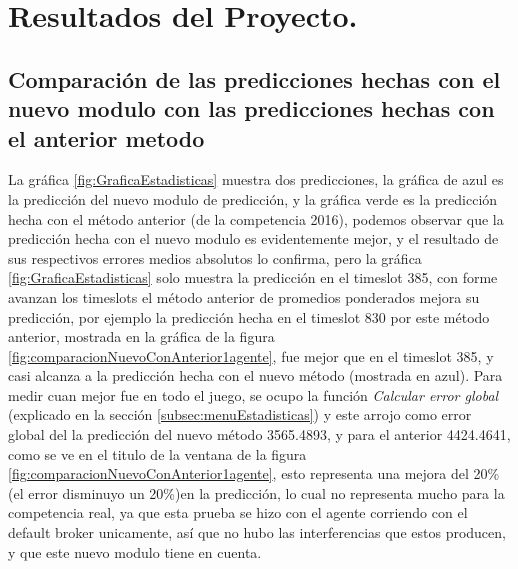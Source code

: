 \chapter{Resultados del Proyecto.}

\section{Comparación de las predicciones hechas con el nuevo modulo con las predicciones hechas con el anterior metodo } \label{subsec:ComparacionesNuevoYviejoMetodo}

La gráfica \ref{fig:GraficaEstadisticas} muestra dos predicciones, la gráfica de azul es la predicción del nuevo modulo de predicción, y la gráfica verde es la predicción hecha con el método anterior (de la competencia 2016), podemos observar que la predicción hecha con el nuevo modulo es evidentemente mejor, y el resultado de sus respectivos errores medios absolutos lo confirma, pero la gráfica \ref{fig:GraficaEstadisticas} solo muestra la predicción en el timeslot 385, con forme avanzan los timeslots el método anterior de promedios ponderados mejora su predicción, por ejemplo la predicción hecha en el timeslot 830 por este método anterior, mostrada en la gráfica de la figura \ref{fig:comparacionNuevoConAnterior1agente}, fue mejor que en el timeslot 385, y casi alcanza a la predicción hecha con el nuevo método (mostrada en azul). Para medir cuan mejor fue en todo el juego, se ocupo la función \textit{Calcular error global} (explicado en la sección \ref{subsec:menuEstadisticas}) y este arrojo como error global del la predicción del nuevo método 3565.4893, y para el anterior 4424.4641, como se ve en el titulo de la ventana de la figura \ref{fig:comparacionNuevoConAnterior1agente}, esto representa una mejora del 20\% (el error disminuyo un 20\%)en la predicción, lo cual no representa mucho para la competencia real, ya que esta prueba se hizo con el agente corriendo con el default broker unicamente, así que no hubo las interferencias que estos producen, y que este nuevo modulo tiene en cuenta.

